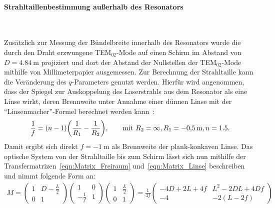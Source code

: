 \documentclass[a4paper,twoside,final]{article}
\begin{document}
\paragraph{Strahltaillenbestimmung außerhalb des Resonators}$~$

Zusätzlich zur Messung der Bündelbreite innerhalb des Resonators wurde die durch den Draht erzwungene TEM$_{02}$-Mode auf einen Schirm im Abstand von $D = \SI{4.84}{\metre}$ projiziert und dort der Abstand der Nullstellen der TEM$_{02}$-Mode mithilfe von Millimeterpapier ausgemessen. Zur Berechnung der Strahltaille kann die Veränderung des $q$-Parameters genutzt werden. Hierfür wird angenommen, dass der Spiegel zur Auskoppelung des Laserstrahls aus dem Resonator als eine Linse wirkt, deren Brennweite unter Annahme einer dünnen Linse mit der ``Linsenmacher''-Formel berechnet werden kann~\cite{Hecht}:
\begin{align}
  \frac{1}{f} = (n-1)\qty(\frac{1}{R_1}-\frac{1}{R_2}), \qquad \text{mit } R_2 = \infty, R_1 = -\SI{0.5}{\metre}, n = 1.5.
\end{align}
Damit ergibt sich direkt $f = -\SI{1}{\metre}$ als Brennweite der plank-konkaven Linse. Das optische System von der Strahltaille bis zum Schirm lässt sich nun mithilfe der Transfermatrizen~\eqref{eqn:Matrix_Freiraum} und~\eqref{eqn:Matrix_Linse} beschreiben und nimmt folgende Form an:
\begin{align}\label{eqn:Transfermatrix_Praxis}
  M = \begin{pmatrix}
    1 & D-\frac{L}{2} \\ 0 & 1
\end{pmatrix} \begin{pmatrix}
  1 & 0 \\ -\frac{1}{f} & 1
\end{pmatrix} \begin{pmatrix}
  1 & \frac{L}{2} \\ 0 & 1
\end{pmatrix} = \frac{1}{4f} \begin{pmatrix}
  -4D+2L +4f & L^2 - 2DL + 4Df \\ -4 & -2(L-2f)
\end{pmatrix}
\end{align}
\end{document}
